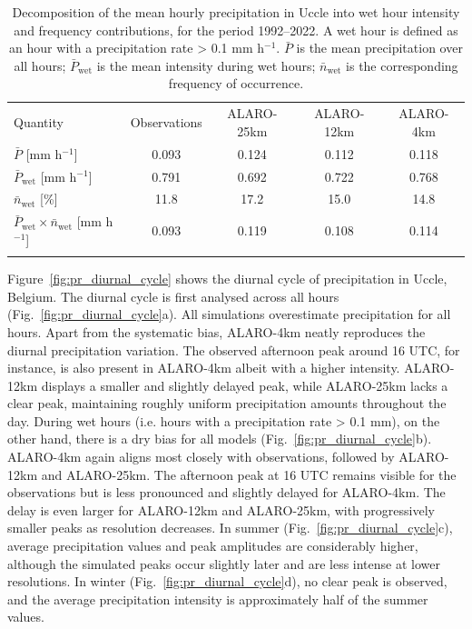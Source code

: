 \documentclass[journal abbreviation, manuscript]{copernicus}
\begin{document}
\begin{table}[t]
\caption{Decomposition of the mean hourly precipitation in Uccle into wet hour intensity and frequency contributions, for the period 1992--2022. A wet hour is defined as an hour with a precipitation rate > 0.1 mm h$^{-1}$. $\bar{P}$ is the mean precipitation over all hours; $\bar{P}_{\text{wet}}$ is the mean intensity during wet hours; $\bar{n}_{\text{wet}}$ is the corresponding frequency of occurrence.}
\begin{tabular}{lcccc}
\tophline
Quantity & Observations & ALARO-25km & ALARO-12km & ALARO-4km \\
\middlehline
$\bar{P}$ [mm h$^{-1}$]                                   & 0.093 & 0.124 & 0.112 & 0.118 \\
\middlehline
$\bar{P}_{\text{wet}}$ [mm h$^{-1}$]                      & 0.791 & 0.692 & 0.722 & 0.768 \\
$\bar{n}_{\text{wet}}$ [\%]                               & 11.8  & 17.2  & 15.0  & 14.8  \\
$\bar{P}_{\text{wet}} \times \bar{n}_{\text{wet}}$ [mm h$^{-1}$] & 0.093 & 0.119 & 0.108 & 0.114 \\
\bottomhline
\end{tabular}
\belowtable{} \label{tab:wet_hours}
\end{table}

Figure~\ref{fig:pr_diurnal_cycle} shows the diurnal cycle of precipitation in Uccle, Belgium.
The diurnal cycle is first analysed across all hours (Fig.~\ref{fig:pr_diurnal_cycle}a). 
All simulations overestimate precipitation for all hours. 
Apart from the systematic bias, ALARO-4km neatly reproduces the diurnal precipitation variation. 
The observed afternoon peak around 16 UTC, for instance, is also present in ALARO-4km albeit with a higher intensity.
ALARO-12km displays a smaller and slightly delayed peak, while ALARO-25km lacks a clear peak, maintaining roughly uniform precipitation amounts throughout the day. 
During wet hours (i.e. hours with a precipitation rate > 0.1 mm), on the other hand, there is a dry bias for all models (Fig.~\ref{fig:pr_diurnal_cycle}b). 
ALARO-4km again aligns most closely with observations, followed by ALARO-12km and ALARO-25km. 
The afternoon peak at 16 UTC remains visible for the observations but is less pronounced and slightly delayed for ALARO-4km. 
The delay is even larger for ALARO-12km and ALARO-25km, with progressively smaller peaks as resolution decreases. 
In summer (Fig.~\ref{fig:pr_diurnal_cycle}c), average precipitation values and peak amplitudes are considerably higher, although the simulated peaks occur slightly later and are less intense at lower resolutions. 
In winter (Fig.~\ref{fig:pr_diurnal_cycle}d), no clear peak is observed, and the average precipitation intensity is approximately half of the summer values.
\end{document}
